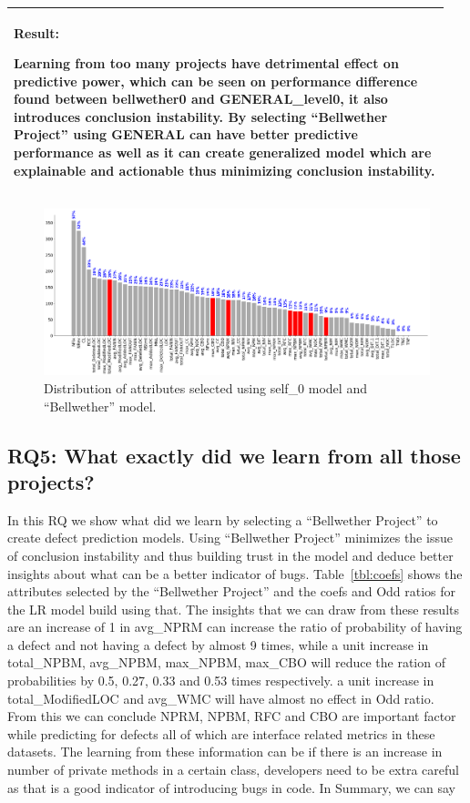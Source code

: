 \documentclass[10pt,journal,compsoc]{IEEEtran}
\newenvironment{result}
{\vspace{0.15cm}
\noindent\begin{minipage}{\linewidth}
\begin{center}
\arrayrulecolor{lightergray}
\begin{tabular}{|p{0.95\linewidth}|}
\hline%
\rowcolor{lightergray}%
\textbf{Result:}~%
}
{\\\hline
\end{tabular}
\end{center}
\end{minipage}
\vspace{0.15cm}
}
\begin{document}
\begin{result}
{Learning from too many projects have detrimental effect on predictive power, which can be seen on performance difference found between bellwether0 and GENERAL\_level0, it also introduces conclusion instability. By selecting ``Bellwether Project'' using GENERAL can have better predictive performance as well as it can create generalized model which are explainable and actionable thus minimizing conclusion instability.}
\end{result}

\begin{figure}[h]
    \centering
    \includegraphics[width=\linewidth]{figs/FSS_compare.png}
    \caption{Distribution of attributes selected using self\_0 model and ``Bellwether'' model.}
    \label{fig:FSS_compare}
\end{figure}

\subsection*{RQ5: What exactly did we learn from all those projects?}
\label{sec:rq5}

In this RQ we show what did we learn by selecting a ``Bellwether Project'' to create defect prediction models. Using ``Bellwether Project''  minimizes the issue of conclusion instability and thus building trust in the model and deduce better insights about what can be a better indicator of bugs. Table~\ref{tbl:coefs} shows the attributes selected by the ``Bellwether Project'' and the coefs and Odd ratios for the LR model build using that. The insights that we can draw from these results are an increase of 1 in avg\_NPRM can increase the ratio of probability of having a defect and not having a defect by almost 9 times, while a unit increase in total\_NPBM, avg\_NPBM, max\_NPBM, max\_CBO will reduce the ration of probabilities by 0.5, 0.27, 0.33 and 0.53 times respectively. a unit increase in total\_ModifiedLOC and avg\_WMC will have almost no effect in Odd ratio. From this we can conclude NPRM, NPBM, RFC and CBO are important factor while predicting for defects all of which are interface related metrics in these datasets. The learning from these information can be if there is an increase in number of private methods in a certain class, developers need to be extra careful as that is a good indicator of introducing bugs in code. In Summary, we can say 
\end{document}
